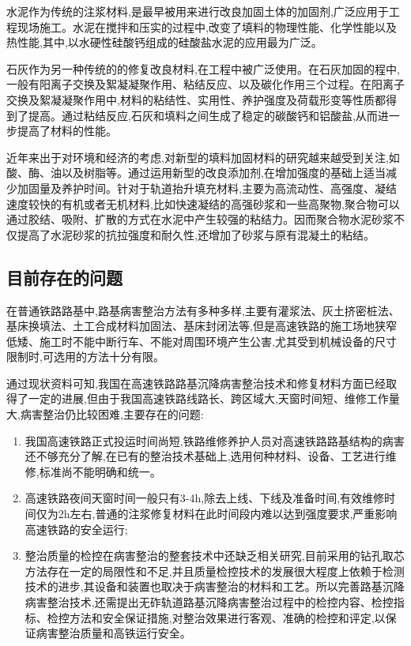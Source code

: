 \documentclass[a4paper,12pt]{ctexrep}
\begin{document}
水泥作为传统的注浆材料,是最早被用来进行改良加固土体的加固剂,广泛应用于工程现场施工。水泥在搅拌和压实的过程中,改变了填料的物理性能、化学性能以及热性能,其中,以水硬性硅酸钙组成的硅酸盐水泥的应用最为广泛。

石灰作为另一种传统的的修复改良材料,在工程中被广泛使用。在石灰加固的程中,一般有阳离子交换及絮凝凝聚作用、粘结反应、以及碳化作用三个过程。在阳离子交换及絮凝凝聚作用中,材料的粘结性、实用性、养护强度及荷载形变等性质都得到了提高。通过粘结反应,石灰和填料之间生成了稳定的碳酸钙和铝酸盐,从而进一步提高了材料的性能。

近年来出于对环境和经济的考虑,对新型的填料加固材料的研究越来越受到关注,如酸、酶、油以及树脂等。通过运用新型的改良添加剂,在增加强度的基础上适当减少加固量及养护时间。针对于轨道抬升填充材料,主要为高流动性、高强度、凝结速度较快的有机或者无机材料,比如快速凝结的高强砂浆和一些高聚物,聚合物可以通过胶结、吸附、扩散的方式在水泥中产生较强的粘结力。因而聚合物水泥砂浆不仅提高了水泥砂浆的抗拉强度和耐久性,还增加了砂浆与原有混凝土的粘结。

\subsection{目前存在的问题}

在普通铁路路基中,路基病害整治方法有多种多样,主要有灌浆法、灰土挤密桩法、基床换填法、土工合成材料加固法、基床封闭法等,但是高速铁路的施工场地狭窄低矮、施工时不能中断行车、不能对周围环境产生公害,尤其受到机械设备的尺寸限制时,可选用的方法十分有限。

通过现状资料可知,我国在高速铁路路基沉降病害整治技术和修复材料方面已经取得了一定的进展,但由于我国高速铁路线路长、跨区域大,天窗时间短、维修工作量大,病害整治仍比较困难,主要存在的问题:
\begin{enumerate}
    \item 我国高速铁路正式投运时间尚短,铁路维修养护人员对高速铁路路基结构的病害还不够充分了解,在已有的整治技术基础上,选用何种材料、设备、工艺进行维修,标准尚不能明确和统一。
    \item 高速铁路夜间天窗时间一般只有3-4h,除去上线、下线及准备时间,有效维修时间仅为2h左右,普通的注浆修复材料在此时间段内难以达到强度要求,严重影响高速铁路的安全运行;
    \item 整治质量的检控在病害整治的整套技术中还缺乏相关研究,目前采用的钻孔取芯方法存在一定的局限性和不足,并且质量检控技术的发展很大程度上依赖于检测技术的进步,其设备和装置也取决于病害整治的材料和工艺。所以完善路基沉降病害整治技术,还需提出无砟轨道路基沉降病害整治过程中的检控内容、检控指标、检控方法和安全保证措施,对整治效果进行客观、准确的检控和评定,以保证病害整治质量和高铁运行安全。
\end{enumerate}
\end{document}
